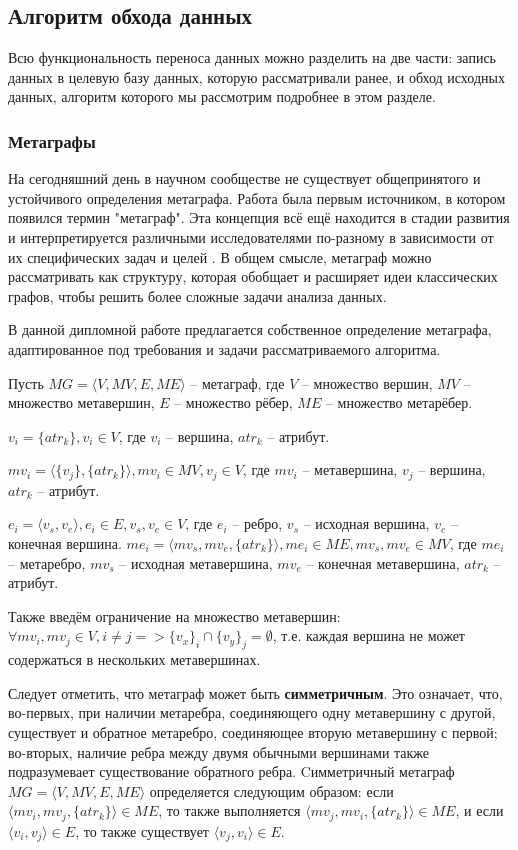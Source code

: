 \subsection{Алгоритм обхода данных}

Всю функциональность переноса данных можно разделить на две части: запись данных в целевую базу данных, которую рассматривали ранее, и обход исходных данных, алгоритм которого мы рассмотрим подробнее в этом разделе.

\subsubsection{Метаграфы}
На сегодняшний день в научном сообществе не существует общепринятого и устойчивого определения метаграфа. Работа \cite{metagraphs_1} была первым источником, в котором появился термин "метаграф". Эта концепция всё ещё находится в стадии развития и интерпретируется различными исследователями по-разному в зависимости от их специфических задач и целей \cite{metagraphs_2, metagraphs_3, metagraphs_4, metagraphs_5}. В общем смысле, метаграф можно рассматривать как структуру, которая обобщает и расширяет идеи классических графов, чтобы решить более сложные задачи анализа данных.

В данной дипломной работе предлагается собственное определение метаграфа, адаптированное под требования и задачи рассматриваемого алгоритма.

Пусть $MG = \langle V, MV, E, ME \rangle$ -- метаграф, где $V$ -- множество вершин, $MV$ -- множество метавершин, $E$ -- множество рёбер, $ME$ -- множество метарёбер.

$v_i = \{atr_k\}, v_i \in V$, где $v_i$ -- вершина, $atr_k$ -- атрибут.

$mv_i = \langle \{v_j\}, \{atr_k\} \rangle, mv_i \in MV, v_j \in V$, где $mv_i$ -- метавершина, $v_j$ -- вершина, $atr_k$ -- атрибут.

$e_i = \langle v_s, v_e \rangle, e_i \in E, v_s, v_e \in V$, где $e_i$ -- ребро, $v_s$ -- исходная вершина, $v_e$ -- конечная вершина.
$me_i = \langle mv_s, mv_e, \{atr_k\} \rangle, me_i \in ME, mv_s, mv_e \in MV$, где $me_i$ -- метаребро, $mv_s$ -- исходная метавершина, $mv_e$ -- конечная метавершина, $atr_k$ -- атрибут.

Также введём ограничение на множество метавершин: $\forall mv_i, mv_j \in V, i \neq j => \{v_x\}_i \cap \{v_y\}_j = \emptyset$, т.е. каждая вершина не может содержаться в нескольких метавершинах.

Следует отметить, что метаграф может быть \textbf{симметричным}. Это означает, что, во-первых, при наличии метаребра, соединяющего одну метавершину с другой, существует и обратное метаребро, соединяющее вторую метавершину с первой; во-вторых, наличие ребра между двумя обычными вершинами также подразумевает существование обратного ребра. Cимметричный метаграф $MG = \langle V, MV, E, ME \rangle$ определяется следующим образом: если $\langle mv_i, mv_j, \{atr_k\} \rangle \in ME$, то также выполняется $\langle mv_j, mv_i, \{atr_k\} \rangle \in ME$, и если $\langle v_i, v_j \rangle \in E$, то также существует $\langle v_j, v_i \rangle \in E$.

